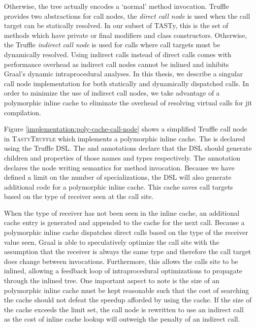 Otherwise, the  tree actually encodes a `normal' method invocation.
Truffle provides two abstractions for call nodes, the \textit{direct call node} is used when the call target can be statically resolved. 
In our subset of TASTy, this is the set of methods which have private or final modifiers\cite{java:lang-spec} and class constructors. 
Otherwise, the Truffle \textit{indirect call node} is used for calls where call targets must be dynamically resolved. 
Using indirect calls instead of direct calls comes with performance overhead as indirect call nodes cannot be inlined and inhibits Graal's dynamic intraprocedural analyses.
In this thesis, we describe a singular call node implementation for both statically and dynamically dispatched calls. 
In order to minimize the use of indirect call nodes, we take advantage of a polymorphic inline cache\cite{self:polymorphic-inline-caches} to eliminate the overhead of resolving virtual calls for \acrshort{jit} compilation. 

Figure \ref{implementation:poly-cache-call-node} shows a simplified Truffle call node in \textsc{TastyTruffle} which implements a polymorphic inline cache.
The  is declared using the Truffle DSL.
The  and  annotations declare that the DSL should generate children and properties of those names and types respectively. 
The  annotation declares the node writing semantics for method invocation.
Because we have defined a limit on the number of specializations, the DSL will also generate additional code for a polymorphic inline cache.
This cache saves call targets based on the type of receiver seen at the call site. 

When the type of receiver has not been seen in the inline cache, an additional cache entry is generated and appended to the cache for the next call.
Because a polymorphic inline cache dispatches direct calls based on the type of the receiver value seen, Graal is able to speculatively optimize the call site with the assumption that the receiver is always the same type and therefore the call target does change between invocations.
Furthermore, this allows the calls site to be inlined, allowing a feedback loop of intraprocedural optimizations\cite{conditional-constant-prop}\cite{variable-congruence} to propagate through the inlined tree.
One important aspect to note is the size of an polymorphic inline cache must be kept reasonable such that the cost of searching the cache should not defeat the speedup afforded by using the cache.
If the size of the cache exceeds the limit set, the call node is rewritten to use an indirect call as the cost of inline cache lookup will outweigh the penalty of an indirect call. 

